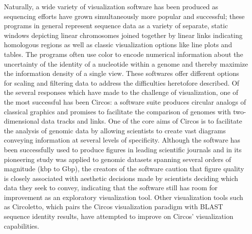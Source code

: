 \documentclass[twocolumn]{article}
\begin{document}
Naturally, a wide variety of visualization software has been produced as sequencing efforts have grown simultaneously more popular and successful; these programs in general represent sequence data as a variety of separate, static windows depicting linear chromosomes joined together by linear links indicating homologous regions as well as classic visualization options like line plots and tables.\cite{challenge} The programs often use color to encode numerical information about the uncertainty of the identity of a nucleotide within a genome and thereby maximize the information density of a single view.\cite{challenge} These softwares offer different options for scaling and filtering data to address the difficulties heretofore described.\cite{challenge} Of the several responses which have made to the challenge of visualization, one of the most successful has been Circos: a software suite produces circular analogs of classical graphics and promises to facilitate the comparison of genomes with two-dimensional data tracks and links. One of the core aims of Circos is to facilitate the analysis of genomic data by allowing scientists to create vast diagrams conveying information at several levels of specificity. Although the software has been successfully used to produce figures in leading scientific journals and in its pioneering study was applied to genomic datasets spanning several orders of magnitude (kbp to Gbp), the creators of the software caution that figure quality is closely associated with aesthetic decisions made by scientists deciding which data they seek to convey, indicating that the software still has room for improvement as an exploratory visualization tool. Other visualization tools such as Circoletto, which pairs the Circos visualization paradigm with BLAST sequence identity results, have attempted to improve on Circos' visualization capabilities. \cite{circoletto} 
\end{document}
